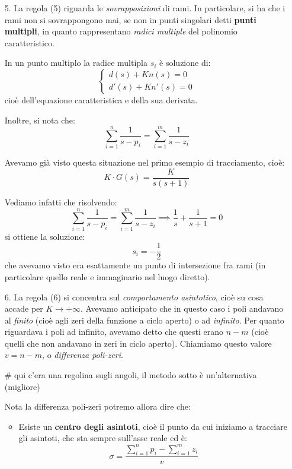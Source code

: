 \documentclass[a4paper,11pt]{article}
\begin{document}
\begin{enumerate}
	\item[5.] La regola (5) riguarda le \textit{sovrapposizioni} di rami.
		In particolare, si ha che i rami non si sovrappongono mai, se non in punti singolari detti \textbf{punti multipli}, in quanto rappresentano \textit{radici multiple} del polinomio caratteristico.

		In un punto multiplo la radice multipla $s_i$ è soluzione di:
		\[
			\begin{cases}
				d(s) + Kn(s) = 0 \\
				d'(s) + K n'(s) = 0
			\end{cases}
		\]
		cioè dell'equazione caratteristica e della sua derivata.

		Inoltre, si nota che:
		$$
		\sum_{i = 1}^n \frac{1}{s - p_i} = \sum_{i = 1}^m \frac{1}{s - z_i}
		$$

		\par\medskip
		\noindent
		\textbf{}

		Avevamo già visto questa situazione nel primo esempio di tracciamento, cioè:
		$$
		K \cdot G(s) = \frac{K}{s(s+1)}
		$$

		Vediamo infatti che risolvendo:
		$$
		\sum_{i = 1}^n \frac{1}{s - p_i} = \sum_{i = 1}^m \frac{1}{s - z_i}
		\implies \frac{1}{s} + \frac{1}{s + 1} = 0
		$$
		si ottiene la soluzione:
		$$
		s_i = -\frac{1}{2}
		$$
		che avevamo visto era esattamente un punto di intersezione fra rami (in particolare quello reale e immaginario nel luogo diretto).

	\item[6.] La regola (6) si concentra sul \textit{comportamento asintotico}, cioè su cosa accade per $K \rightarrow +\infty$.
		Avevamo anticipato che in questo caso i poli andavano al \textit{finito} (cioè agli zeri della funzione a ciclo aperto) o ad \textit{infinito}.
		Per quanto riguardava i poli ad infinito, avevamo detto che questi erano $n - m$ (cioè quelli che non andavano in zeri in ciclo aperto).
		Chiamiamo questo valore $v = n - m$, o \textit{differenza poli-zeri}.

		# qui c'era una regolina sugli angoli, il metodo sotto è un'alternativa (migliore)

		Nota la differenza poli-zeri potremo allora dire che:
		\begin{itemize}
			\item Esiste un \textbf{centro degli asintoti}, cioè il punto da cui iniziamo a tracciare gli asintoti, che sta sempre sull'asse reale ed è:
				$$
				\sigma = \frac{ \sum_{i = 1}^n p_i - \sum_{i = 1}^m z_i }{v}
				$$


\end{itemize}
\end{enumerate}
\end{document}
